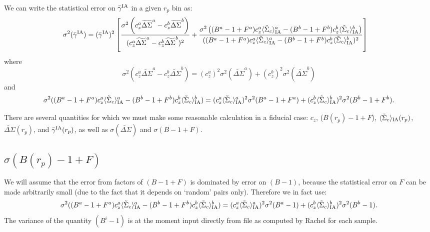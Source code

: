 \documentclass[onecolumn,amsmath,aps,fleqn, superscriptaddress]{revtex4}
\begin{document}
We can write the statistical error on $\bar{\gamma}^{\rm IA}$ in a given $r_p$ bin as:
\begin{align}
\sigma^2(\bar{\gamma}^{\rm IA}) &= (\bar{\gamma}^{\rm IA})^2 \left[\frac{\sigma^2\left(c_z^a \widetilde{\Delta\Sigma}^a - c_z^b \widetilde{\Delta\Sigma}^b\right)}{(c_z^a \widetilde{\Delta\Sigma}^a - c_z^b \widetilde{\Delta\Sigma}^b)^2} + \frac{\sigma^2\left((B^a-1+F^a)c_z^a \langle \tilde{\Sigma}_c\rangle_{\rm IA}^a - (B^b-1+F^b)c_z^b \langle \tilde{\Sigma}_c\rangle_{\rm IA}^b\right)}{((B^a-1+F^a)c_z^a \langle \tilde{\Sigma}_c\rangle_{\rm IA}^a - (B^b-1+F^b)c_z^b \langle \tilde{\Sigma}_c\rangle_{\rm IA}^b)^2} \right] 
\label{siggam}
\end{align}
where
\begin{equation}
\sigma^2(c_z^a \widetilde{\Delta\Sigma}^a  - c_z^b \widetilde{\Delta\Sigma}^b) = (c_z^a)^2  \sigma^2 (\widetilde{\Delta\Sigma}^a) + (c_z^b)^2\sigma^2(\widetilde{\Delta\Sigma}^b)
\label{sigtop}
\end{equation}
and 
\begin{equation}
\sigma^2((B^a-1+F^a)c_z^a \langle \tilde{\Sigma}_c\rangle_{\rm IA}^a - (B^b-1+F^b)c_z^b \langle \tilde{\Sigma}_c\rangle_{\rm IA}^b) = (c_z^a \langle \tilde{\Sigma}_c\rangle_{\rm IA}^a)^2 \sigma^2(B^a-1+F^a) + (c_z^b \langle \tilde{\Sigma}_c\rangle_{\rm IA}^b)^2 \sigma^2(B^b-1+F^b).
\label{sigbottom}
\end{equation}

There are several quantities for which we must make some reasonable calculation in a fiducial case: $c_z$, ($B(r_p)-1+F$), $\langle \tilde{\Sigma}_c\rangle_{\rm IA}(r_p)$, $\widetilde{\Delta\Sigma}(r_p)$, and $\bar{\gamma}^{\rm IA}(r_p)$, as well as $\sigma(\widetilde{\Delta \Sigma})$ and $\sigma(B-1+F)$.

\subsection{$\sigma(B(r_p)-1+F)$}
We will assume that the error from factors of $(B-1+F)$ is dominated by error on $(B-1)$, because the statistical error on $F$ can be made arbitrarily small (due to the fact that it depends on `random' pairs only). Therefore we in fact use:
\begin{equation}
\sigma^2((B^a-1+F^a)c_z^a \langle \tilde{\Sigma}_c\rangle_{\rm IA}^a - (B^b-1+F^b)c_z^b \langle \tilde{\Sigma}_c\rangle_{\rm IA}^b) = (c_z^a \langle \tilde{\Sigma}_c\rangle_{\rm IA}^a)^2 \sigma^2(B^a-1) + (c_z^b \langle \tilde{\Sigma}_c\rangle_{\rm IA}^b)^2 \sigma^2(B^b-1).
\label{sigbottom}
\end{equation}
The variance of the quantity $(B^i-1)$ is at the moment input directly from file as computed by Rachel for each sample.
\end{document}
